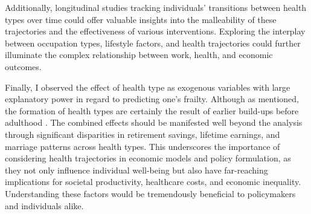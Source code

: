 Additionally, longitudinal studies tracking individuals' transitions between health types over time could offer valuable insights into the malleability of these trajectories and the effectiveness of various interventions. Exploring the interplay between occupation types, lifestyle factors, and health trajectories could further illuminate the complex relationship between work, health, and economic outcomes.

Finally, I observed the effect of health type as exogenous variables with large explanatory power in regard to predicting one’s frailty. Although as \citet{denardi2024wp} mentioned, the formation of health types are certainly the result of earlier build-ups before adulthood \citep{borella_nber}. The combined effects should be manifested well beyond the analysis through significant disparities in retirement savings, lifetime earnings, and marriage patterns across health types. This underscores the importance of considering health trajectories in economic models and policy formulation, as they not only influence individual well-being but also have far-reaching implications for societal productivity, healthcare costs, and economic inequality. Understanding these factors would be tremendously beneficial to policymakers and individuals alike.
